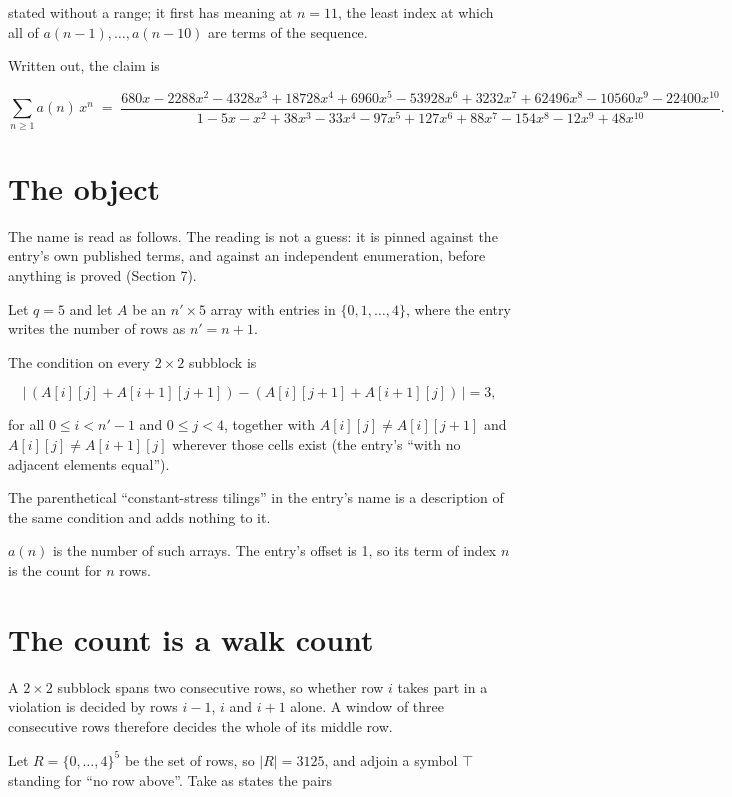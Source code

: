 \documentclass[11pt]{article}
\theoremstyle{definition}
\begin{document}
stated without a range; it first has meaning at $n = 11$, the least index at which all of $a(n-1),\dots,a(n-10)$ are terms of the sequence.

Written out, the claim is

\[\sum_{n \ge 1} a(n)\,x^n \;=\; \frac{680x - 2288x^{2} - 4328x^{3} + 18728x^{4} + 6960x^{5} - 53928x^{6} + 3232x^{7} + 62496x^{8} - 10560x^{9} - 22400x^{10}}{1 - 5x - x^{2} + 38x^{3} - 33x^{4} - 97x^{5} + 127x^{6} + 88x^{7} - 154x^{8} - 12x^{9} + 48x^{10}}.\]

\section{The object}

The name is read as follows. The reading is not a guess: it is pinned against the entry's own published terms, and against an independent enumeration, before anything is proved (Section 7).

Let $q = 5$ and let $A$ be an $n' \times 5$ array with entries in $\{0,1,\dots,4\}$, where the entry writes the number of rows as $n' = n + 1$.

The condition on every $2 \times 2$ subblock is

\[\bigl|\,(A[i][j] + A[i{+}1][j{+}1]) - (A[i][j{+}1] + A[i{+}1][j])\,\bigr| = 3,\]

for all $0 \le i < n'-1$ and $0 \le j < 4$, together with $A[i][j] \ne A[i][j{+}1]$ and $A[i][j] \ne A[i{+}1][j]$ wherever those cells exist (the entry's ``with no adjacent elements equal'').

The parenthetical ``constant-stress tilings'' in the entry's name is a description of the same condition and adds nothing to it.

$a(n)$ is the number of such arrays. The entry's offset is 1, so its term of index $n$ is the count for $n$ rows.

\section{The count is a walk count}

A $2 \times 2$ subblock spans two consecutive rows, so whether row $i$ takes part in a violation is decided by rows $i-1$, $i$ and $i+1$ alone. A window of three consecutive rows therefore decides the whole of its middle row.

Let $R = \{0,\dots,4\}^{5}$ be the set of rows, so $|R| = 3125$, and adjoin a symbol $\top$ standing for ``no row above''. Take as states the pairs
\end{document}
